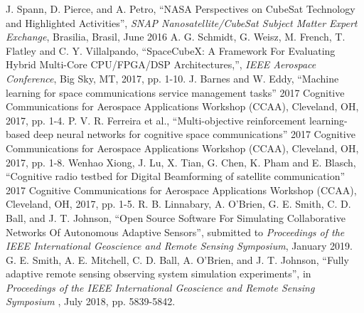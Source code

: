 \documentclass[conference]{IEEEtran}
\begin{document}
\small
\begin{thebibliography}{9}
 {
    J. Spann, D. Pierce, and A. Petro, ``NASA Perspectives on CubeSat Technology
    and Highlighted Activities'',
    \textit{SNAP Nanosatellite/CubeSat Subject Matter Expert Exchange},
    Brasilia, Brasil, June 2016}
 {
    A. G. Schmidt, G. Weisz, M. French, T. Flatley and C. Y. Villalpando,
    ``SpaceCubeX: A Framework For Evaluating Hybrid Multi-Core CPU/FPGA/DSP
    Architectures,'', \textit{IEEE Aerospace Conference}, Big Sky, MT, 2017,
    pp. 1-10.}
 {
    J. Barnes and W. Eddy, ``Machine learning for space communications service
    management tasks'' 2017 Cognitive Communications for Aerospace Applications
    Workshop (CCAA), Cleveland, OH, 2017, pp. 1-4.
  }
 {
    P. V. R. Ferreira et al.,
    ``Multi-objective reinforcement learning-based deep neural networks for
    cognitive space communications''
    2017 Cognitive Communications for Aerospace Applications Workshop (CCAA),
    Cleveland, OH, 2017, pp. 1-8.
  }
 {
    Wenhao Xiong, J. Lu, X. Tian, G. Chen, K. Pham and E. Blasch, ``Cognitive
    radio testbed for Digital Beamforming of satellite communication'' 2017
    Cognitive Communications for Aerospace Applications Workshop (CCAA),
    Cleveland, OH, 2017, pp. 1-5.
}
 {
    R. B. Linnabary, A. O'Brien, G. E. Smith, C. D. Ball, and J. T. Johnson,
    ``Open Source Software For Simulating Collaborative Networks Of Autonomous
    Adaptive Sensors'', submitted to {\it Proceedings of the IEEE International
      Geoscience and Remote Sensing Symposium}, January 2019.}
 {
    G. E. Smith, A. E. Mitchell, C. D. Ball, A. O'Brien, and J. T. Johnson,
    ``Fully adaptive remote sensing observing system simulation experiments'',
    in {
      \it Proceedings of the IEEE International Geoscience and Remote Sensing
      Symposium} , July 2018, pp. 5839-5842.}
\end{thebibliography}
\end{document}
